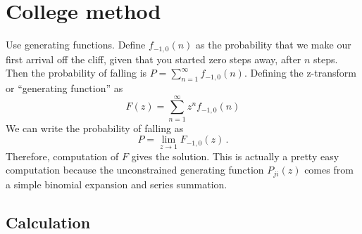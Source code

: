 \documentclass{article}
\begin{document}
\section{College method}

Use generating functions.
Define $f_{-1,0}(n)$ as the probability that we make our first arrival off the cliff, given that you started zero steps away, after $n$ steps.
Then the probability of falling is $P = \sum_{n=1}^{\infty} f_{-1,0}(n)$.
Defining the z-transform or ``generating function'' as
\begin{equation}
F(z) = \sum_{n=1}^{\infty} z^n f_{-1,0}(n)
\end{equation}
We can write the probability of falling as
\begin{equation}
P = \lim_{z\rightarrow 1}F_{-1,0}(z) \, . \end{equation}
Therefore, computation of $F$ gives the solution.
This is actually a pretty easy computation because the unconstrained generating function $P_{ji}(z)$ comes from a simple binomial expansion and series summation.

\subsection{Calculation}
\end{document}
